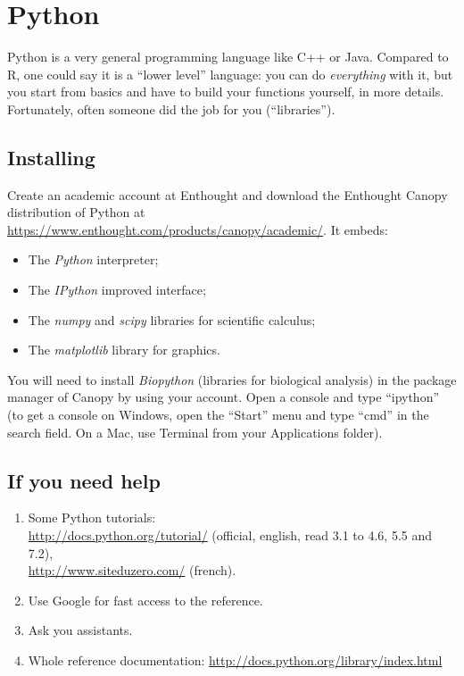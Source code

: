 \documentclass[a4paper,11pt]{article}
\begin{document}
\clearpage

\section{Python}

Python is a very general programming language like C++ or Java. Compared to R, one could say it is a ``lower level'' language:
you can do {\it everything} with it, but you start from basics and have to build your functions yourself, in more details.
Fortunately, often someone did the job for you (``libraries'').

\subsection{Installing}
Create an academic account at Enthought and download the Enthought Canopy distribution of Python at \url{https://www.enthought.com/products/canopy/academic/}. It embeds:
\begin{itemize}
\item The {\it Python} interpreter;
\item The {\it IPython} improved interface;
\item The {\it numpy} and {\it scipy} libraries for scientific calculus;
\item The {\it matplotlib} library for graphics.
\end{itemize}
You will need to install {\it Biopython} (libraries for biological analysis) in the package manager of Canopy by using your account. Open a console and type ``ipython''
(to get a console on Windows, open the ``Start'' menu and type ``cmd'' in the search field. On a Mac, use Terminal 
from your Applications folder).

\subsection{If you need help}
\begin{enumerate}
\item Some Python tutorials: \\
      \url{http://docs.python.org/tutorial/} (official, english, read 3.1 to 4.6, 5.5 and 7.2),\\
      \url{http://www.siteduzero.com/} (french).
\item Use Google for fast access to the reference.
\item Ask you assistants.
\item Whole reference documentation: \url{http://docs.python.org/library/index.html}
\end{enumerate}
\end{document}
